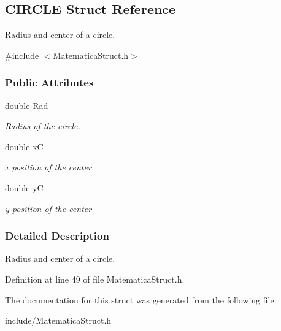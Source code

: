 \hypertarget{structCIRCLE}{\subsection{\-C\-I\-R\-C\-L\-E \-Struct \-Reference}
\label{structCIRCLE}
}


\-Radius and center of a circle.  




{\ttfamily \#include $<$\-Matematica\-Struct.\-h$>$}

\subsubsection*{\-Public \-Attributes}
\begin{DoxyCompactItemize}
\item 
\hypertarget{structCIRCLE_a860bef50013f57ab1a6437b7986a9487}{double \hyperlink{structCIRCLE_a860bef50013f57ab1a6437b7986a9487}{\-Rad}}\label{structCIRCLE_a860bef50013f57ab1a6437b7986a9487}

\begin{DoxyCompactList}\small\item\em \-Radius of the circle. \end{DoxyCompactList}\item 
\hypertarget{structCIRCLE_a948efd29e2703858b2752cdba79b89c2}{double \hyperlink{structCIRCLE_a948efd29e2703858b2752cdba79b89c2}{x\-C}}\label{structCIRCLE_a948efd29e2703858b2752cdba79b89c2}

\begin{DoxyCompactList}\small\item\em x position of the center \end{DoxyCompactList}\item 
\hypertarget{structCIRCLE_a7d873dd60d81fee341939655db765355}{double \hyperlink{structCIRCLE_a7d873dd60d81fee341939655db765355}{y\-C}}\label{structCIRCLE_a7d873dd60d81fee341939655db765355}

\begin{DoxyCompactList}\small\item\em y position of the center \end{DoxyCompactList}\end{DoxyCompactItemize}


\subsubsection{\-Detailed \-Description}
\-Radius and center of a circle. 

\-Definition at line 49 of file \-Matematica\-Struct.\-h.



\-The documentation for this struct was generated from the following file\-:\begin{DoxyCompactItemize}
\item 
include/\-Matematica\-Struct.\-h\end{DoxyCompactItemize}
